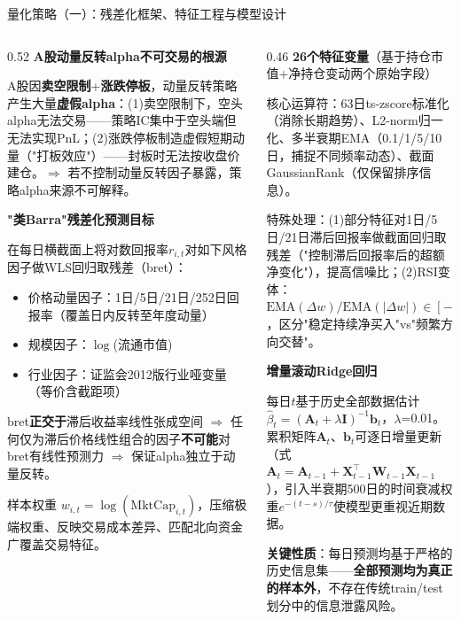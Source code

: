 \documentclass[10pt, aspectratio=169]{beamer}
\begin{document}
\begin{frame}{量化策略（一）：残差化框架、特征工程与模型设计}
\begin{columns}[T]
\begin{column}{0.52\textwidth}
\textbf{A股动量反转alpha不可交易的根源}

A股因\textbf{卖空限制}+\textbf{涨跌停板}，动量反转策略产生大量\textbf{虚假alpha}：(1)卖空限制下，空头alpha无法交易——策略IC集中于空头端但无法实现PnL；(2)涨跌停板制造虚假短期动量（"打板效应"）——封板时无法按收盘价建仓。$\Rightarrow$ 若不控制动量反转因子暴露，策略alpha来源不可解释。

\vspace{0.2em}
\textbf{"类Barra"残差化预测目标}

在每日横截面上将对数回报率$r_{i,t}$对如下风格因子做WLS回归取残差（bret）：
\begin{itemize}\setlength\itemsep{0pt}
    \item 价格动量因子：1日/5日/21日/252日回报率（覆盖日内反转至年度动量）
    \item 规模因子：$\log$(流通市值)
    \item 行业因子：证监会2012版行业哑变量（等价含截距项）
\end{itemize}
bret\textbf{正交于}滞后收益率线性张成空间 $\Rightarrow$ 任何仅为滞后价格线性组合的因子\textbf{不可能}对bret有线性预测力 $\Rightarrow$ 保证alpha独立于动量反转。

\vspace{0.2em}
样本权重 $w_{i,t} = \log(\text{MktCap}_{i,t})$，压缩极端权重、反映交易成本差异、匹配北向资金广覆盖交易特征。
\end{column}
\begin{column}{0.46\textwidth}
\textbf{26个特征变量}（基于持仓市值+净持仓变动两个原始字段）

核心运算符：63日ts-zscore标准化（消除长期趋势）、L2-norm归一化、多半衰期EMA（0.1/1/5/10日，捕捉不同频率动态）、截面GaussianRank（仅保留排序信息）。

特殊处理：(1)部分特征对1日/5日/21日滞后回报率做截面回归取残差（"控制滞后回报率后的超额净变化"），提高信噪比；(2)RSI变体：$\text{EMA}(\Delta w)/\text{EMA}(|\Delta w|)\in[-1,1]$，区分"稳定持续净买入"vs"频繁方向交替"。

\vspace{0.3em}
\textbf{增量滚动Ridge回归}

每日$t$基于历史全部数据估计$\hat{\beta}_t = (\mathbf{A}_t+\lambda\mathbf{I})^{-1}\mathbf{b}_t$，$\lambda$=0.01。累积矩阵$\mathbf{A}_t$、$\mathbf{b}_t$可逐日增量更新（式$\mathbf{A}_t = \mathbf{A}_{t-1} + \mathbf{X}_{t-1}^\top\mathbf{W}_{t-1}\mathbf{X}_{t-1}$），引入半衰期500日的时间衰减权重$e^{-(t-s)/\tau}$使模型更重视近期数据。

\textbf{关键性质}：每日预测均基于严格的历史信息集——\textbf{全部预测均为真正的样本外}，不存在传统train/test划分中的信息泄露风险。
\end{column}
\end{columns}
\end{frame}
\end{document}
